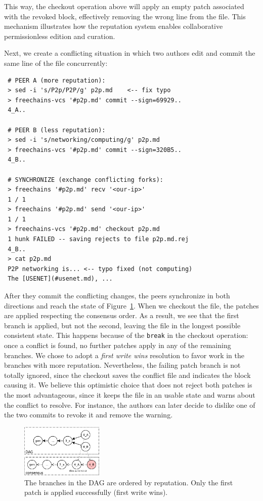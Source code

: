 \documentclass[10pt,journal,compsoc]{IEEEtran}
\newcommand{\code}[1]  {\texttt{\footnotesize{#1}}}
\begin{document}
This way, the checkout operation above will apply an empty patch associated
with the revoked block, effectively removing the wrong line from the file.
This mechanism illustrates how the reputation system enables collaborative
permissionless edition and curation.

Next, we create a conflicting situation in which two authors edit and commit
the same line of the file concurrently:

{\footnotesize
\begin{verbatim}
 # PEER A (more reputation):
 > sed -i 's/P2p/P2P/g' p2p.md    <-- fix typo
 > freechains-vcs '#p2p.md' commit --sign=69929..
 4_A..

 # PEER B (less reputation):
 > sed -i 's/networking/computing/g' p2p.md
 > freechains-vcs '#p2p.md' commit --sign=320B5..
 4_B..

 # SYNCHRONIZE (exchange conflicting forks):
 > freechains '#p2p.md' recv '<our-ip>'
 1 / 1
 > freechains '#p2p.md' send '<our-ip>'
 1 / 1
 > freechains-vcs '#p2p.md' checkout p2p.md
 1 hunk FAILED -- saving rejects to file p2p.md.rej
 4_B..
 > cat p2p.md
 P2P networking is... <-- typo fixed (not computing)
 The [USENET](#usenet.md), ...
\end{verbatim}
}

After they commit the conflicting changes, the peers synchronize in both
directions and reach the state of Figure~\ref{fig.conflict}.
When we checkout the file, the patches are applied respecting the consensus
order.
As a result, we see that the first branch is applied, but not the second,
leaving the file in the longest possible consistent state.
%
This happens because of the \code{break} in the checkout operation:
once a conflict is found, no further patches apply in any of the remaining
branches.
%
We chose to adopt a \emph{first write wins} resolution to favor work in the
branches with more reputation.
Nevertheless, the failing patch branch is not totally ignored, since the
checkout saves the conflict file and indicates the block causing it.
%
We believe this optimistic choice that does not reject both patches is the most
advantageous, since it keeps the file in an usable state and warns about the
conflict to resolve.
For instance, the authors can later decide to dislike one of the two commits to
revoke it and remove the warning.

\begin{figure}
\centering
\includegraphics[width=0.35\textwidth]{conflict.png}
\caption{
    The branches in the DAG are ordered by reputation.
    Only the first patch is applied successfully (first write wins).
}
\label{fig.conflict}
\end{figure}
\end{document}
